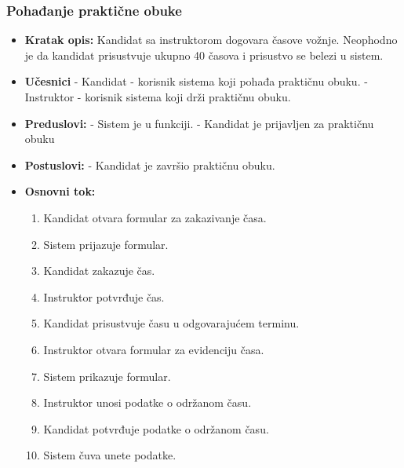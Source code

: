 \subsubsection{Pohađanje praktične obuke}

\vspace{3mm}

\begin{itemize}

\item \textbf{Kratak opis:} Kandidat sa instruktorom dogovara časove vožnje. Neophodno je da kandidat prisustvuje ukupno 40 časova i prisustvo se belezi u sistem.

\vspace{2mm}

\item \textbf{Učesnici} \newline
   - Kandidat - korisnik sistema koji pohađa praktičnu obuku.\newline   
   - Instruktor - korisnik sistema koji drži praktičnu obuku. 
   
\item \textbf{Preduslovi:} \newline
   - Sistem je u funkciji. \newline
   - Kandidat je prijavljen za praktičnu obuku 

\item \textbf{Postuslovi:} \newline
    - Kandidat je završio praktičnu obuku.

\pagebreak
\item \textbf{Osnovni tok:}  
   \begin{enumerate}
   \item Kandidat otvara formular za zakazivanje časa.
   \item Sistem prijazuje formular.
   \item Kandidat zakazuje čas.
   \item Instruktor potvrđuje čas.
   \item Kandidat prisustvuje času u odgovarajućem terminu.
   \item Instruktor otvara formular za evidenciju časa.
   \item Sistem prikazuje formular.
   \item Instruktor unosi podatke o održanom času.
   \item Kandidat potvrđuje podatke o održanom času.
   \item Sistem čuva unete podatke. \newline
   \end{enumerate}


\end{itemize}
